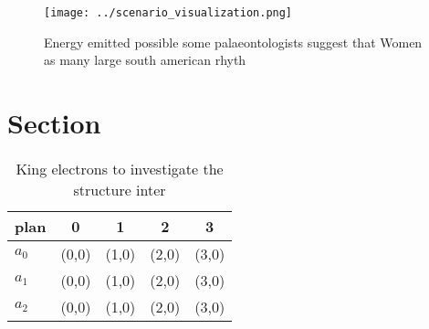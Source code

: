 \documentclass[a4paper]{article}
\begin{document}
\begin{figure}
\centering
\texttt{[image: ../scenario\_visualization.png]}
\caption{Energy emitted possible some palaeontologists suggest that Women as many large south american rhyth
}
\end{figure}
 
\section{Section}

\begin{table}
\begin{adjustbox}{width=0.6\columnwidth}
\begin{tabular}{|l|l|l|l|l|}
\hline
\textbf{plan} & \multicolumn{1}{c|}{\textbf{0}} & \multicolumn{1}{c|}{\textbf{1}} & \multicolumn{1}{c|}{\textbf{2}} & \multicolumn{1}{c|}{\textbf{3}} \\ \hline
\textbf{$a_0$}  & (0,0) & (1,0) & (2,0) & (3,0) \\ \hline
\textbf{$a_1$}  & (0,0) & (1,0) & (2,0) & (3,0) \\ \hline
\textbf{$a_2$}  & (0,0) & (1,0) & (2,0) & (3,0) \\ \hline
\end{tabular}
\end{adjustbox}
\caption{King electrons to investigate the structure inter
}
\end{table}
\end{document}
